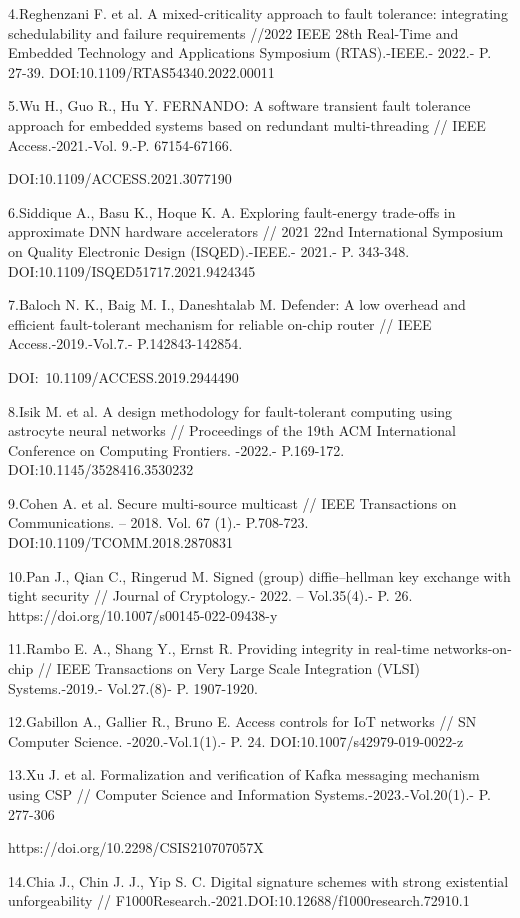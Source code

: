 4.Reghenzani F. et al. A mixed-criticality approach to fault tolerance:
integrating schedulability and failure requirements //2022 IEEE 28th
Real-Time and Embedded Technology and Applications Symposium
(RTAS).-IEEE.- 2022.- P. 27-39. DOI:10.1109/RTAS54340.2022.00011

5.Wu H., Guo R., Hu Y. FERNANDO: A software transient fault tolerance
approach for embedded systems based on redundant multi-threading // IEEE
Access.-2021.-Vol. 9.-P. 67154-67166.

DOI:10.1109/ACCESS.2021.3077190

6.Siddique A., Basu K., Hoque K. A. Exploring fault-energy trade-offs in
approximate DNN hardware accelerators // 2021 22nd International
Symposium on Quality Electronic Design (ISQED).-IEEE.- 2021.- P.
343-348. DOI:10.1109/ISQED51717.2021.9424345

7.Baloch N. K., Baig M. I., Daneshtalab M. Defender: A low overhead and
efficient fault-tolerant mechanism for reliable on-chip router // IEEE
Access.-2019.-Vol.7.- P.142843-142854.

DOI:~10.1109/ACCESS.2019.2944490

8.Isik M. et al. A design methodology for fault-tolerant computing using
astrocyte neural networks // Proceedings of the 19th ACM International
Conference on Computing Frontiers. -2022.- P.169-172.
DOI:10.1145/3528416.3530232

9.Cohen A. et al. Secure multi-source multicast // IEEE Transactions on
Communications. -- 2018. Vol. 67 (1).- P.708-723.
DOI:10.1109/TCOMM.2018.2870831

10.Pan J., Qian C., Ringerud M. Signed (group) diffie--hellman key
exchange with tight security // Journal of Cryptology.- 2022. --
Vol.35(4).- P. 26. https://doi.org/10.1007/s00145-022-09438-y

11.Rambo E. A., Shang Y., Ernst R. Providing integrity in real-time
networks-on-chip // IEEE Transactions on Very Large Scale Integration
(VLSI) Systems.-2019.- Vol.27.(8)- P. 1907-1920.

12.Gabillon A., Gallier R., Bruno E. Access controls for IoT networks //
SN Computer Science. -2020.-Vol.1(1).- P. 24.
DOI:10.1007/s42979-019-0022-z

13.Xu J. et al. Formalization and verification of Kafka messaging
mechanism using CSP // Computer Science and Information
Systems.-2023.-Vol.20(1).- P. 277-306

https://doi.org/10.2298/CSIS210707057X

14.Chia J., Chin J. J., Yip S. C. Digital signature schemes with strong
existential unforgeability //
F1000Research.-2021.DOI:10.12688/f1000research.72910.1

